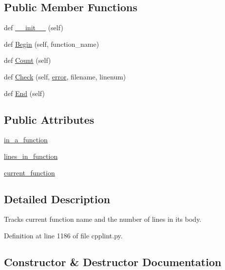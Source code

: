 \subsection*{Public Member Functions}
\begin{DoxyCompactItemize}
\item 
def \hyperlink{classcpplint_1_1___function_state_a3f6a865710852cc74c6a7085180458ae}{\+\_\+\+\_\+init\+\_\+\+\_\+} (self)
\item 
def \hyperlink{classcpplint_1_1___function_state_a41215c4d73baccbb340f6d0df1c1f4b3}{Begin} (self, function\+\_\+name)
\item 
def \hyperlink{classcpplint_1_1___function_state_ac25c9711911ae181b091b52619cf2701}{Count} (self)
\item 
def \hyperlink{classcpplint_1_1___function_state_a5e4ad7d7b104038b45204ab4abf527b2}{Check} (self, \hyperlink{_07copy_08_2_read_camera_model_8m_ac546fdc9911f4a876dbfaffbc7426f8b}{error}, filename, linenum)
\item 
def \hyperlink{classcpplint_1_1___function_state_a1ab6b0a575c25c135f9004b7fb12dc4a}{End} (self)
\end{DoxyCompactItemize}
\subsection*{Public Attributes}
\begin{DoxyCompactItemize}
\item 
\hyperlink{classcpplint_1_1___function_state_a8362d472591f60462184bf68b49c0efb}{in\+\_\+a\+\_\+function}
\item 
\hyperlink{classcpplint_1_1___function_state_a886f5d476adc81f499a711750a399aa2}{lines\+\_\+in\+\_\+function}
\item 
\hyperlink{classcpplint_1_1___function_state_a320674f54bd75087febc8f0d83620569}{current\+\_\+function}
\end{DoxyCompactItemize}


\subsection{Detailed Description}
\begin{DoxyVerb}Tracks current function name and the number of lines in its body.\end{DoxyVerb}
 

Definition at line 1186 of file cpplint.\+py.



\subsection{Constructor \& Destructor Documentation}

